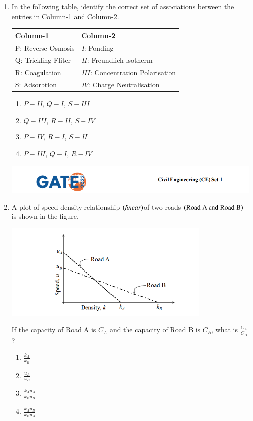 \documentclass[journal,14pt,onecolumn]{IEEEtran}
\theoremstyle{remark}
\begin{document}
\begin{enumerate}[label={Q\arabic*.}]
\item In the following table, identify the correct set of associations between the entries in Column-1 and Column-2.
\begin{table}[h!]
    \centering
    \begin{tabular}{|l|l|}
    \hline
    Column-1 & Column-2 \\
    \hline
    P: Reverse Osmosis & $I$: Ponding \\
    \hline
    Q: Trickling Fliter & $II$: Freundlich Isotherm \\
    \hline
    R: Coagulation & $III$: Concentration Polarisation \\
    \hline
    S: Adsorbtion & $IV$: Charge Neutralisation\\
    \hline
    \end{tabular}
\end{table}
\begin{enumerate}
    \item $P-II$, $Q-I$, $S-III$
    \item $Q-III$, $R-II$, $S-IV$
    \item $P-IV$, $R-I$, $S-II$
    \item $P-III$, $Q-I$, $R-IV$
\end{enumerate}

\newpage

\includegraphics[width=\textwidth]{pics/header.png}
\item A plot of speed-density relationship $\left(\textit{linear}\right) $of two roads $\left(\text{Road A and Road B}\right)$ is shown in the figure.

\includegraphics[width=10cm]{pics/Screenshot 2025-08-08 213009.png}

If the capacity of Road A is $C_A$ and the capacity of Road B is $C_B$, what is $\frac{C_A}{C_B}$?
\begin{enumerate}
    \item $\frac{k_A}{k_B}$
    \item $\frac{u_A}{u_B}$
    \item $\frac{k_Au_A}{k_Bu_B}$
    \item $\frac{k_Au_B}{k_Bu_A}$
\end{enumerate}
\vspace{1cm}


\end{enumerate}
\end{document}
